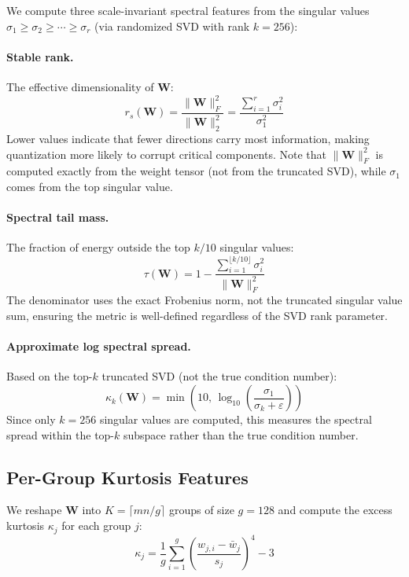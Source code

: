 \documentclass{article}
\begin{document}
We compute three scale-invariant spectral features from the singular values $\sigma_1 \geq \sigma_2 \geq \cdots \geq \sigma_r$ (via randomized SVD with rank $k = 256$):

\paragraph{Stable rank.} The effective dimensionality of $\mathbf{W}$:
\begin{equation}
    r_s(\mathbf{W}) = \frac{\|\mathbf{W}\|_F^2}{\|\mathbf{W}\|_2^2} = \frac{\sum_{i=1}^{r} \sigma_i^2}{\sigma_1^2}
\end{equation}
Lower values indicate that fewer directions carry most information, making quantization more likely to corrupt critical components. Note that $\|\mathbf{W}\|_F^2$ is computed exactly from the weight tensor (not from the truncated SVD), while $\sigma_1$ comes from the top singular value.

\paragraph{Spectral tail mass.} The fraction of energy outside the top $k/10$ singular values:
\begin{equation}
    \tau(\mathbf{W}) = 1 - \frac{\sum_{i=1}^{\lfloor k/10 \rfloor} \sigma_i^2}{\|\mathbf{W}\|_F^2}
\end{equation}
The denominator uses the exact Frobenius norm, not the truncated singular value sum, ensuring the metric is well-defined regardless of the SVD rank parameter.

\paragraph{Approximate log spectral spread.} Based on the top-$k$ truncated SVD (not the true condition number):
\begin{equation}
    \kappa_k(\mathbf{W}) = \min\!\left(10, \, \log_{10}\!\left(\frac{\sigma_1}{\sigma_k + \varepsilon}\right)\right)
\end{equation}
Since only $k=256$ singular values are computed, this measures the spectral spread within the top-$k$ subspace rather than the true condition number.

\subsection{Per-Group Kurtosis Features}

We reshape $\mathbf{W}$ into $K = \lceil mn / g \rceil$ groups of size $g = 128$ and compute the excess kurtosis $\kappa_j$ for each group $j$:
\begin{equation}
    \kappa_j = \frac{1}{g} \sum_{i=1}^{g} \left(\frac{w_{j,i} - \bar{w}_j}{s_j}\right)^4 - 3
\end{equation}
\end{document}
